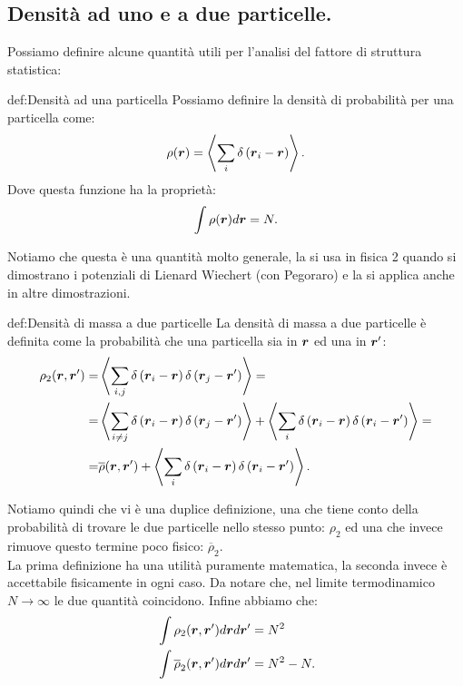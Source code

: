 \subsection{Densità ad uno e a due particelle.}
\label{subsec:Densità ad uno e a due particelle.}
Possiamo definire alcune quantità utili per l'analisi del fattore di struttura statistica: 
\begin{defn}{def:Densità ad una particella}
	Possiamo definire la densità di probabilità per una particella come:
	\[
		\rho (\boldsymbol{r}) = \left<\sum_{i}^{} \delta\left( \boldsymbol{r}_i - \boldsymbol{r} \right)\right>
	.\] 
	Dove questa funzione ha la proprietà:
	\[
		\int\rho (\boldsymbol{r})d \boldsymbol{r} = N 
	.\] 
\end{defn}
Notiamo che questa è una quantità molto generale, la si usa in fisica 2 quando si dimostrano i potenziali di Lienard Wiechert (con Pegoraro) e la si applica anche in altre dimostrazioni.
\newpage
\begin{defn}{def:Densità di massa a due particelle}
	La densità di massa a due particelle è definita come la probabilità che una particella sia in $\boldsymbol{r}$ ed una in $\boldsymbol{r}'$:
	\[\begin{aligned}
		\rho _2(\boldsymbol{r},\boldsymbol{r}') 
		=&
		\left<\sum_{i,j}^{} \delta\left( \boldsymbol{r}_i-\boldsymbol{r} \right) \delta\left( \boldsymbol{r}_j-\boldsymbol{r}' \right)  \right> =\\
		=&
		\left<\sum_{i\neq j}^{} \delta\left( \boldsymbol{r}_i -\boldsymbol{r} \right) \delta\left( \boldsymbol{r}_j-\boldsymbol{r}' \right)  \right>
		+
		\left<\sum_{i}^{} \delta\left( \boldsymbol{r}_i-\boldsymbol{r} \right) \delta\left( \boldsymbol{r}_i -\boldsymbol{r}' \right)  \right> = \\
		=&
		\overline{\rho}(\boldsymbol{r},\boldsymbol{r}') 
		+
		\left<\sum_{i}^{} \delta\left( \boldsymbol{r}_i-\boldsymbol{r} \right)\delta\left( \boldsymbol{r}_i-\boldsymbol{r}' \right)   \right>
	.\end{aligned}\]
\end{defn}
Notiamo quindi che vi è una duplice definizione, una che tiene conto della probabilità di trovare le due particelle nello stesso punto: $\rho _2$ ed una che invece rimuove questo termine poco fisico: $\overline{\rho }_2$.\\
La prima definizione ha una utilità puramente matematica, la seconda invece è accettabile fisicamente in ogni caso. Da notare che, nel limite termodinamico $N\to \infty$ le due quantità coincidono. Infine abbiamo che:
\[\begin{aligned}
	&\int\rho _2(\boldsymbol{r},\boldsymbol{r}')d \boldsymbol{r}d \boldsymbol{r}' = N^2\\
	&\int \overline{\rho } _2(\boldsymbol{r},\boldsymbol{r}')d \boldsymbol{r}d \boldsymbol{r}' = N^2 -N
.\end{aligned}\]

